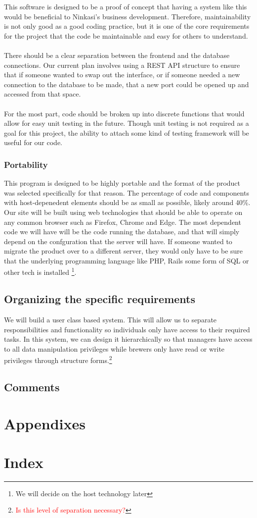\documentclass[draftclsnofoot,onecolumn,letterpaper,10pt,compsoc]{IEEEtran}
\newcommand\question[1]{\footnote{\textcolor{red}{#1}}}
\begin{document}
		This software is designed to be a proof of concept that having a system like this would be beneficial to Ninkasi's business development.
		Therefore, maintainability is not only good as a good coding practice, but it is one of the core requirements for the project that the code be maintainable and easy for others to understand.
		\\ \\
		There should be a clear separation between the frontend and the database connections.
		Our current plan involves using a REST API structure to ensure that if someone wanted to swap out the interface, or if someone needed a new connection to the database to be made, that a new port could be opened up and accessed from that space.
		\\ \\
		For the most part, code should be broken up into discrete functions that would allow for easy unit testing in the future.
		Though unit testing is not required as a goal for this project, the ability to attach some kind of testing framework will be useful for our code.

		\subsubsection{Portability}

		This program is designed to be highly portable and the format of the product was selected specifically for that reason.
		The percentage of code and components with host-depenedent elements should be as small as possible, likely around 40\%.
		Our site will be built using web technologies that should be able to operate on any common browser such as Firefox, Chrome and Edge.
		The most dependent code we will have will be the code running the database, and that will simply depend on the confguration that the server will have.
		If someone wanted to migrate the product over to a different server, they would only have to be sure that the underlying programming language like PHP, Rails some form of SQL or other tech is installed
		\footnote{We will decide on the host technology later}.

	\subsection{Organizing the specific requirements}
		We will build a user class based system. This will allow us to separate responsibilities and functionality so individuals only have access to their required tasks. In this system, we can design it hierarchically so that managers have access to all data manipulation privileges while brewers only have read or write privileges through structure forms.\question{Is this level of separation necessary?}
	\subsection{Comments}
\section{Appendixes}
\section{Index}

\pagebreak

\end{document}
